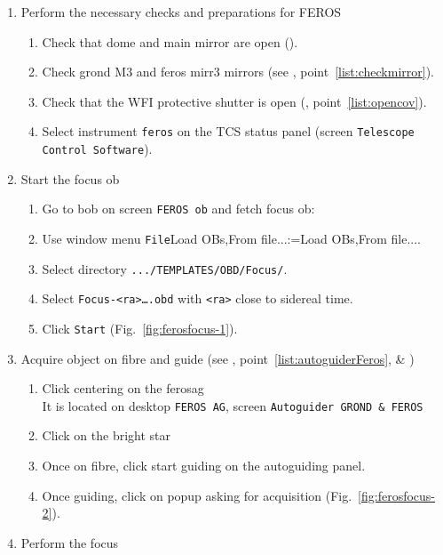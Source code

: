 \documentclass[11pt,fleqn,a4paper]{book}
\makeatletter
\def\menu#1#2{\texttt{#1}\ifx{}#2\else\@for\@x:=#2\do{$\rightarrow$\texttt{\@x}}\fi}
\def\wmenu#1#2{window menu \menu{#1}{#2}}
\def\fetchob{\wmenu{File}{Load OBs,From file...}}
\makeatother
\begin{document}
\label{proc:ferosfocus}
\begin{enumerate}
  \item Perform the necessary checks and preparations for FEROS
  \begin{enumerate}
    \item Check that dome and \gls{main mirror} are open ().\label{list:ferosfocus1}
    \item Check \gls{grond} \gls{M3} and \gls{feros} \gls{mirr3} mirrors (see , point~\ref{list:checkmirror}).
    \item Check that the WFI \gls{protective shutter} is open (, point~\ref{list:opencov}).
    \item Select instrument \texttt{feros} on the \gls{TCS status panel} (screen \texttt{Telescope Control Software}).
  \end{enumerate}
  \item Start the focus \gls{ob}
  \begin{enumerate}
     \item Go to \gls{bob} on screen \texttt{FEROS \gls{ob}} and fetch \gls{focus} \gls{ob}:
     \item Use \fetchob.
     \item Select directory \texttt{.../TEMPLATES/OBD/Focus/}.
     \item Select \texttt{Focus-<ra>….obd} with \texttt{<ra>} close to sidereal time.
     \item Click \texttt{Start} (Fig.~\ref{fig:ferosfocus-1}).
  \end{enumerate}
  \item Acquire object on fibre and guide (see , point~\ref{list:autoguiderFeros}, \& )
  \begin{enumerate}
     \item Click centering on the \gls{ferosag}\\
           It is located on \gls{desktop} \texttt{FEROS AG}, screen \texttt{Autoguider GROND \& FEROS}
     \item Click on the bright star
     \item Once on fibre, click start guiding on the \gls{autoguiding} panel.
     \item Once guiding, click on popup asking for acquisition (Fig.~\ref{fig:ferosfocus-2}).
  \end{enumerate}
  \item Perform the \gls{focus}
  \begin{enumerate}

\end{enumerate}
\end{enumerate}
\end{document}
